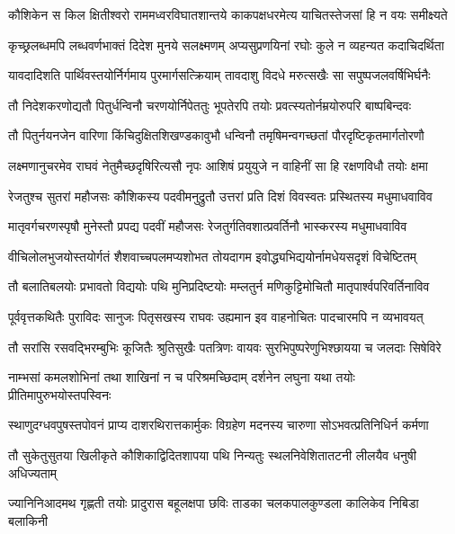 
\twolineshloka
{कौशिकेन स किल क्षितीश्वरो राममध्वरविघातशान्तये}
{काकपक्षधरमेत्य याचितस्तेजसां हि न वयः समीक्ष्यते}%

\twolineshloka
{कृच्छ्रलब्धमपि लब्धवर्णभाक्तं दिदेश मुनये सलक्ष्मणम्}
{अप्यसुप्रणयिनां रघोः कुले न व्यहन्यत कदाचिदर्थिता}%

\twolineshloka
{यावदादिशति पार्थिवस्तयोर्निर्गमाय पुरमार्गसत्क्रियाम्}
{तावदाशु विदधे मरुत्सखैः सा सपुष्पजलवर्षिभिर्घनैः}%

\twolineshloka
{तौ निदेशकरणोद्यतौ पितुर्धन्विनौ चरणयोर्निपेततुः}
{भूपतेरपि तयोः प्रवत्स्यतोर्नम्रयोरुपरि बाष्पबिन्दवः}%

\twolineshloka
{तौ पितुर्नयनजेन वारिणा किंचिदुक्षितशिखण्डकावुभौ}
{धन्विनौ तमृषिमन्वगच्छतां पौरदृष्टिकृतमार्गतोरणौ}%

\twolineshloka
{लक्ष्मणानुचरमेव राघवं नेतुमैच्छदृषिरित्यसौ नृपः}
{आशिषं प्रयुयुजे न वाहिनीं सा हि रक्षणविधौ तयोः क्षमा}%

\twolineshloka
{रेजतुश्च सुतरां महौजसः कौशिकस्य पदवीमनुद्रुतौ}
{उत्तरां प्रति दिशं विवस्वतः प्रस्थितस्य मधुमाधवाविव}%

\twolineshloka
{मातृवर्गचरणस्पृषौ मुनेस्तौ प्रपद्य पदवीं महौजसः}
{रेजतुर्गतिवशात्प्रवर्तिनौ भास्करस्य मधुमाधवाविव}%

\twolineshloka
{वीचिलोलभुजयोस्तयोर्गतं शैशवाच्चपलमप्यशोभत}
{तोयदागम इवोद्ध्यभिद्ययोर्नामधेयसदृशं विचेष्टितम्}%

\twolineshloka
{तौ बलातिबलयोः प्रभावतो विद्ययोः पथि मुनिप्रदिष्टयोः}
{मम्लतुर्न मणिकुट्टिमोचितौ मातृपार्श्वपरिवर्तिनाविव}%

\twolineshloka
{पूर्ववृत्तकथितैः पुराविदः सानुजः पितृसखस्य राघवः}
{उह्यमान इव वाहनोचितः पादचारमपि न व्यभावयत्}%

\twolineshloka
{तौ सरांसि रसवद्भिरम्बुभिः कूजितैः श्रुतिसुखैः पतत्रिणः}
{वायवः सुरभिपुष्परेणुभिश्छायया च जलदाः सिषेविरे}%

\twolineshloka
{नाम्भसां कमलशोभिनां तथा शाखिनां न च परिश्रमच्छिदाम्}
{दर्शनेन लघुना यथा तयोः प्रीतिमापुरुभयोस्तपस्विनः}%

\twolineshloka
{स्थाणुदग्धवपुषस्तपोवनं प्राप्य दाशरथिरात्तकार्मुकः}
{विग्रहेण मदनस्य चारुणा सोऽभवत्प्रतिनिधिर्न कर्मणा}%

\twolineshloka
{तौ सुकेतुसुतया खिलीकृते कौशिकाद्विदितशापया पथि}
{निन्यतुः स्थलनिवेशितातटनी लीलयैव धनुषी अधिज्यताम्}%

\twolineshloka
{ज्यानिनिआदमथ गृह्णती तयोः प्रादुरास बहूलक्षपा छविः}
{ताडका चलकपालकुण्डला कालिकेव निबिडा बलाकिनी}%


